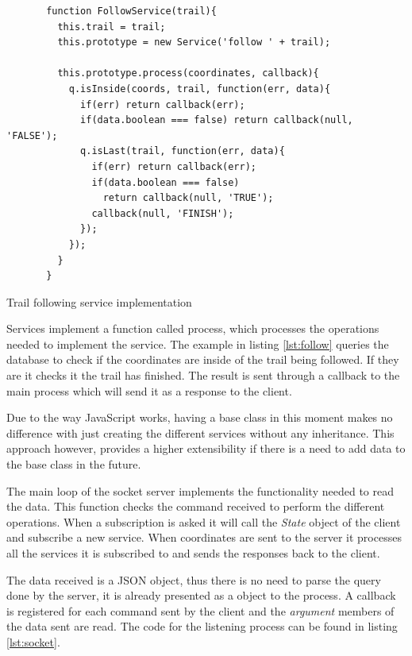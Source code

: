\begin{listing}[ht]\centering
  \begin{minipage}{.8\textwidth}
    \begin{verbatim}
       function FollowService(trail){
         this.trail = trail;
         this.prototype = new Service('follow ' + trail);
         
         this.prototype.process(coordinates, callback){
           q.isInside(coords, trail, function(err, data){
             if(err) return callback(err);
             if(data.boolean === false) return callback(null, 'FALSE'); 
             q.isLast(trail, function(err, data){
               if(err) return callback(err);
               if(data.boolean === false)
                 return callback(null, 'TRUE');
               callback(null, 'FINISH');
             });
           });
         }
       }
    \end{verbatim}
  \end{minipage}
  \caption{Trail following service implementation}\label{lst:follow}
\end{listing}

Services implement a function called process, which processes the operations needed to implement the service. The example in listing \ref{lst:follow} queries the database to check if the coordinates are inside of the trail being followed. If they are it checks it the trail has finished. The result is sent through a callback to the main process which will send it as a response to the client.

Due to the way JavaScript works, having a base class in this moment makes no difference with just creating the different services without any inheritance. This approach however, provides a higher extensibility if there is a need to add data to the base class in the future.

The main loop of the socket server implements the functionality needed to read the data. This function checks the command received to perform the different operations. When a subscription is asked it will call the \textit{State} object of the client and subscribe a new service. When coordinates are sent to the server it processes all the services it is subscribed to and sends the responses back to the client.

The data received is a JSON object, thus there is no need to parse the query done by the server, it is already presented as a object to the process. A callback is registered for each command sent by the client and the \textit{argument} members of the data sent are read. The code for the listening process can be found in listing \ref{lst:socket}.

